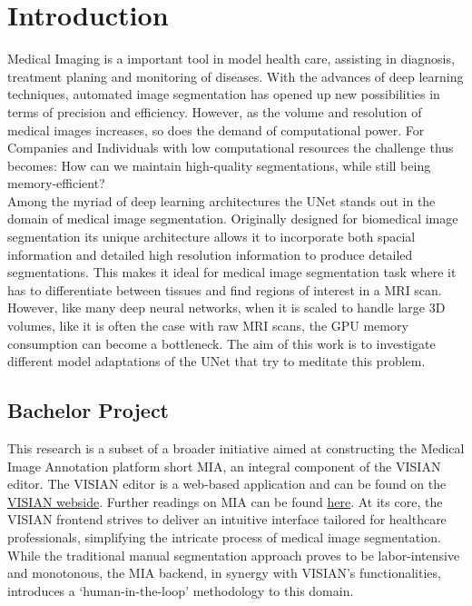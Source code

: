 \chapter{Introduction}
\noindent Medical Imaging is a important tool in model health care, assisting in diagnosis, treatment planing and monitoring of diseases.
With the advances of deep learning techniques, automated image segmentation has opened up new possibilities in terms of precision and efficiency.
However, as the volume and resolution of medical images increases, so does the demand of computational power.
For Companies and Individuals with low computational resources the challenge thus becomes: How can we maintain high-quality segmentations, while still being memory-efficient?\\

\noindent Among the myriad of deep learning architectures the UNet stands out in the domain of medical image segmentation.
Originally designed for biomedical image segmentation its unique architecture allows it to incorporate both spacial information and detailed high resolution information to produce detailed segmentations.
This makes it ideal for medical image segmentation task where it has to differentiate between tissues and find regions of interest in a MRI scan.
However, like many deep neural networks, when it is scaled to handle large 3D volumes, like it is often the case with raw MRI scans, the GPU memory consumption can become a bottleneck.
The aim of this work is to investigate different model adaptations of the UNet that try to meditate this problem.

\section{Bachelor Project}
This research is a subset of a broader initiative aimed at constructing the Medical Image Annotation platform short MIA, an integral component of the VISIAN editor.
The VISIAN editor is a web-based application and can be found on the \href{https://visian.org/}{VISIAN webside}. Further readings on MIA can be found \href{https://mia-ai.vercel.app/}{here}.
At its core, the VISIAN frontend strives to deliver an intuitive interface tailored for healthcare professionals, simplifying the intricate process of medical image segmentation.
While the traditional manual segmentation approach proves to be labor-intensive and monotonous, the MIA backend, in synergy with VISIAN's functionalities,
introduces a `human-in-the-loop' methodology to this domain.

